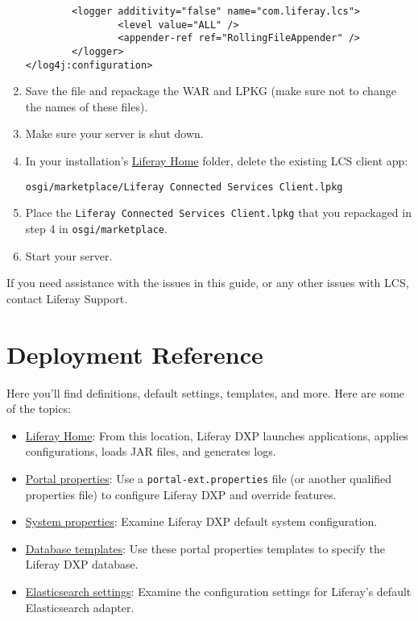 \begin{enumerate}
\begin{verbatim}
        <logger additivity="false" name="com.liferay.lcs">
                <level value="ALL" />
                <appender-ref ref="RollingFileAppender" />
        </logger>
</log4j:configuration>
\end{verbatim}
\item
  Save the file and repackage the WAR and LPKG (make sure not to change
  the names of these files).
\item
  Make sure your server is shut down.
\item
  In your installation's
  \href{/docs/7-2/deploy/-/knowledge_base/d/liferay-home}{Liferay Home}
  folder, delete the existing LCS client app:

\begin{verbatim}
osgi/marketplace/Liferay Connected Services Client.lpkg
\end{verbatim}
\item
  Place the \texttt{Liferay\ Connected\ Services\ Client.lpkg} that you
  repackaged in step 4 in \texttt{osgi/marketplace}.
\item
  Start your server.
\end{enumerate}

If you need assistance with the issues in this guide, or any other
issues with LCS, contact Liferay Support.

\chapter{Deployment Reference}\label{deployment-reference}

Here you'll find definitions, default settings, templates, and more.
Here are some of the topics:

\begin{itemize}
\item
  \href{/docs/7-2/deploy/-/knowledge_base/d/liferay-home}{Liferay Home}:
  From this location, Liferay DXP launches applications, applies
  configurations, loads JAR files, and generates logs.
\item
  \href{/docs/7-2/deploy/-/knowledge_base/d/portal-properties}{Portal
  properties}: Use a \texttt{portal-ext.properties} file (or another
  qualified properties file) to configure Liferay DXP and override
  features.
\item
  \href{/docs/7-2/deploy/-/knowledge_base/d/system-properties}{System
  properties}: Examine Liferay DXP default system configuration.
\item
  \href{/docs/7-2/deploy/-/knowledge_base/d/database-templates}{Database
  templates}: Use these portal properties templates to specify the
  Liferay DXP database.
\item
  \href{/docs/7-2/deploy/-/knowledge_base/d/elasticsearch-connector-settings-reference}{Elasticsearch
  settings}: Examine the configuration settings for Liferay's default
  Elasticsearch adapter.
\end{itemize}

